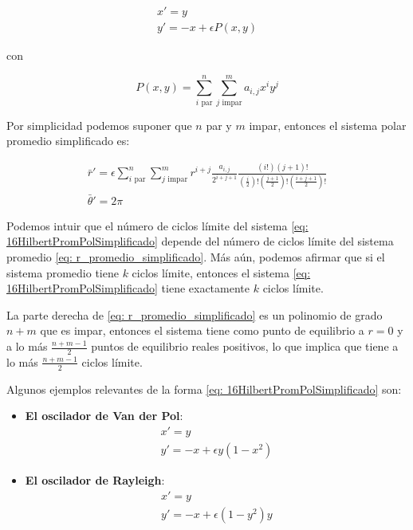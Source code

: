 \begin{equation}\label{eq: 16HilbertPromPolSimplificado}
	\begin{matrix}
		x'=y  \\
		y'= -x + \epsilon P(x,y)
	\end{matrix}
\end{equation}

con 

\[
P(x,y) = \sum_{i \text{ par}}^{n} \sum_{j \text{ impar}}^{m} a_{i,j} x^i y^j
\]

Por simplicidad podemos suponer que $n$ par y $m$ impar, entonces el sistema polar promedio simplificado es:

\begin{equation}\label{eq: r_promedio_simplificado}
	\begin{matrix}
		\bar{r}'=\epsilon\sum_{i \text{ par}}^{n}\sum_{j \text{ impar}}^{m}r^{i+j}\frac{a_{i,j}}{2^{i+j+1}}\frac{\left(i!\right)\left(j+1\right)!}{\left(\frac{i}{2}\right)!\left(\frac{j+1}{2}\right)!\left(\frac{i+j+1}{2}\right)!} \\
		\bar{\theta}'=2\pi
	\end{matrix}
\end{equation}

Podemos intuir que el número de ciclos límite del sistema \eqref{eq: 16HilbertPromPolSimplificado} depende del número de ciclos límite del sistema promedio \eqref{eq: r_promedio_simplificado}. Más aún, podemos afirmar que si el sistema promedio tiene $k$ ciclos límite, entonces el sistema \eqref{eq: 16HilbertPromPolSimplificado} tiene exactamente $k$ ciclos límite.

La parte derecha de \eqref{eq: r_promedio_simplificado} es un polinomio de grado $n+m$ que es impar, entonces el sistema tiene como punto de equilibrio a $r=0$ y a lo más $\frac{n+m-1}{2}$ puntos de equilibrio reales positivos, lo que implica que tiene a lo más $\frac{n+m-1}{2}$ ciclos límite.

Algunos ejemplos relevantes de la forma \eqref{eq: 16HilbertPromPolSimplificado} son:

\begin{itemize}
	\item \textbf{El oscilador de Van der Pol}:
	\[
		\begin{matrix}
			x'=y \\
			y'=-x+\epsilon y(1-x^2)
		\end{matrix}
		\]
	\item \textbf{El oscilador de Rayleigh}:
	\[
		\begin{matrix}
			x'=y \\
			y'=-x+\epsilon(1-y^2)y
		\end{matrix}
	\]
\end{itemize}

